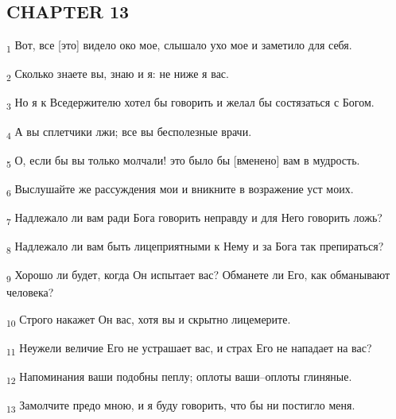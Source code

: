 \subsection{CHAPTER 13}
\begin{tcolorbox}
\textsubscript{1} Вот, все [это] видело око мое, слышало ухо мое и заметило для себя.
\end{tcolorbox}
\begin{tcolorbox}
\textsubscript{2} Сколько знаете вы, знаю и я: не ниже я вас.
\end{tcolorbox}
\begin{tcolorbox}
\textsubscript{3} Но я к Вседержителю хотел бы говорить и желал бы состязаться с Богом.
\end{tcolorbox}
\begin{tcolorbox}
\textsubscript{4} А вы сплетчики лжи; все вы бесполезные врачи.
\end{tcolorbox}
\begin{tcolorbox}
\textsubscript{5} О, если бы вы только молчали! это было бы [вменено] вам в мудрость.
\end{tcolorbox}
\begin{tcolorbox}
\textsubscript{6} Выслушайте же рассуждения мои и вникните в возражение уст моих.
\end{tcolorbox}
\begin{tcolorbox}
\textsubscript{7} Надлежало ли вам ради Бога говорить неправду и для Него говорить ложь?
\end{tcolorbox}
\begin{tcolorbox}
\textsubscript{8} Надлежало ли вам быть лицеприятными к Нему и за Бога так препираться?
\end{tcolorbox}
\begin{tcolorbox}
\textsubscript{9} Хорошо ли будет, когда Он испытает вас? Обманете ли Его, как обманывают человека?
\end{tcolorbox}
\begin{tcolorbox}
\textsubscript{10} Строго накажет Он вас, хотя вы и скрытно лицемерите.
\end{tcolorbox}
\begin{tcolorbox}
\textsubscript{11} Неужели величие Его не устрашает вас, и страх Его не нападает на вас?
\end{tcolorbox}
\begin{tcolorbox}
\textsubscript{12} Напоминания ваши подобны пеплу; оплоты ваши--оплоты глиняные.
\end{tcolorbox}
\begin{tcolorbox}
\textsubscript{13} Замолчите предо мною, и я буду говорить, что бы ни постигло меня.
\end{tcolorbox}

